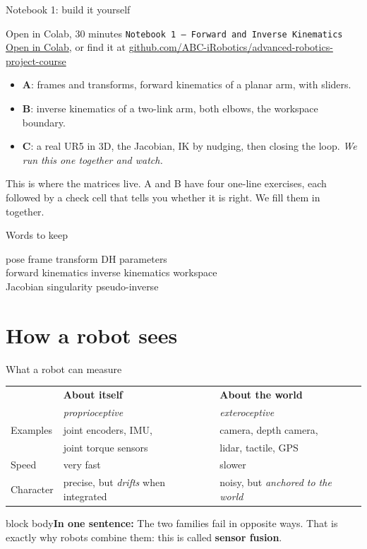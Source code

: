 \documentclass[aspectratio=169]{beamer}
\newcommand{\takeaway}[1]{\vspace{2mm}\begin{beamercolorbox}[rounded=true,sep=4pt,wd=\textwidth]{block body}\footnotesize\textbf{In one sentence:} #1\end{beamercolorbox}}
\newcommand{\wordsframe}[1]{\begin{frame}{Words to keep}\begin{center}\Large #1\end{center}\end{frame}}
\begin{document}
\begin{frame}{Notebook 1: build it yourself}
	\begin{block}{Open in Colab, 30 minutes}
		\texttt{Notebook 1 -- Forward and Inverse Kinematics}\\ {\scriptsize \href{https://colab.research.google.com/github/ABC-iRobotics/advanced-robotics-project-course/blob/main/week01_classical_robotics/notebooks/nb1_fk_ik_STUDENT.ipynb}{\textcolor{blue!70!black}{Open in Colab}}, or find it at \href{https://github.com/ABC-iRobotics/advanced-robotics-project-course}{\textcolor{blue!70!black}{github.com/ABC-iRobotics/advanced-robotics-project-course}}}
	\end{block}
	\begin{itemize}
		\item \textbf{A}: frames and transforms, forward kinematics of a planar arm, with sliders.
		\item \textbf{B}: inverse kinematics of a two-link arm, both elbows, the workspace boundary.
		\item \textbf{C}: a real UR5 in 3D, the Jacobian, IK by nudging, then closing the loop. \emph{We run this one together and watch.}
	\end{itemize}
	\vspace{2mm}
	This is where the matrices live. A and B have four one-line exercises, each followed by a check cell that tells you whether it is right. We fill them in together.
\end{frame}

\wordsframe{pose \quad frame \quad transform \quad DH parameters \\[3mm] forward kinematics \quad inverse kinematics \quad workspace \\[3mm] Jacobian \quad singularity \quad pseudo-inverse}

\section{How a robot sees}

\begin{frame}{What a robot can measure}
	\begin{center}
		\begin{tabular}{lll}
			\toprule
			& \textbf{About itself} & \textbf{About the world} \\
			& \emph{proprioceptive} & \emph{exteroceptive} \\
			\midrule
			Examples & joint encoders, IMU, & camera, depth camera, \\
			         & joint torque sensors & lidar, tactile, GPS \\
			Speed & very fast & slower \\
			Character & precise, but \emph{drifts} when integrated & noisy, but \emph{anchored to the world} \\
			\bottomrule
		\end{tabular}
	\end{center}
	\takeaway{The two families fail in opposite ways. That is exactly why robots combine them: this is called \textbf{sensor fusion}.}
\end{frame}
\end{document}
